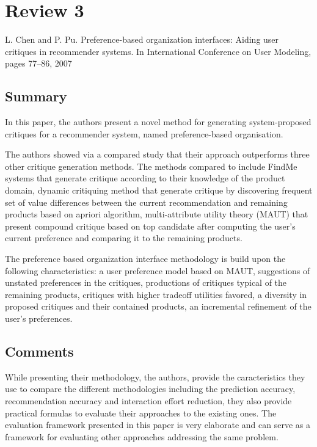 \documentclass{article}
\begin{document}
\section*{Review 3}
L. Chen and P. Pu. Preference-based organization interfaces: Aiding user 
critiques in recommender systems. In International Conference on 
User Modeling, pages 77–86, 2007

\subsection*{Summary}

In this paper, the authors present a novel method for generating 
system-proposed critiques for a recommender system, named preference-based
organisation.

The authors showed via a compared study that their approach outperforms three
other critique generation methods. The methods compared to include FindMe
systems that generate critique according to their knowledge of the product
domain, dynamic critiquing method that generate critique by discovering
frequent set of value differences between the current recommendation and
remaining products based on apriori algorithm, multi-attribute utility theory
(MAUT) that present compound critique based on top candidate after computing
the user’s current preference and comparing it to the remaining products.

The preference based organization interface methodology is build upon the
following characteristics: a user preference model based on MAUT, suggestions
of unstated preferences in the critiques, productions of critiques typical of
the remaining products, critiques with higher tradeoff utilities favored,
a diversity in proposed critiques and their contained products, an incremental
refinement of the user’s preferences.

\subsection*{Comments}

While presenting their methodology, the authors, provide the caracteristics
they use to compare the different methodologies including the prediction 
accuracy, recommendation accuracy and interaction effort reduction, they also
provide practical formulas to evaluate their approaches to the existing ones.
The evaluation framework presented in this paper is very elaborate and can
serve as a framework for evaluating other approaches addressing the same
problem.
\end{document}
